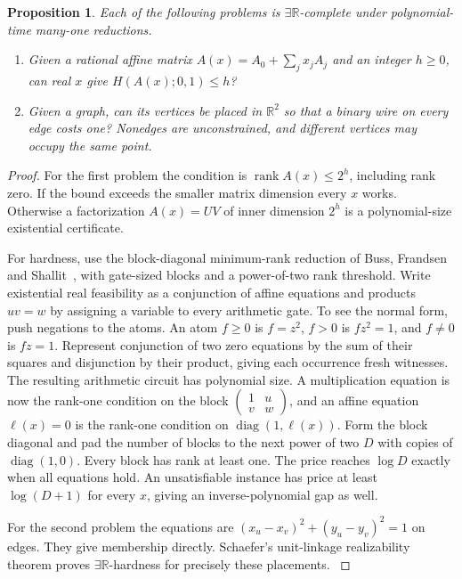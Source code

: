 \documentclass[11pt,letterpaper]{article}
\newtheorem{proposition}[theorem]{Proposition}
\theoremstyle{definition}
\newcommand{\R}{\mathbb R}
\newcommand{\etr}{\exists\R}
\DeclareMathOperator{\rank}{rank}
\begin{document}
\begin{proposition}\label{prop:inverse}
Each of the following problems is \(\etr\)-complete under polynomial-time
many-one reductions.
\begin{enumerate}
\item Given a rational affine matrix \(A(x)=A_0+\sum_j x_j A_j\) and
an integer \(h\ge0\), can real \(x\) give \(H(A(x);0,1)\le h\)?
\item Given a graph, can its vertices be placed in \(\R^2\) so that a
binary wire on every edge costs one? Nonedges are unconstrained, and
different vertices may occupy the same point.
\end{enumerate}
\end{proposition}
\begin{proof}
For the first problem the condition is \(\rank A(x)\le2^h\), including
rank zero. If the bound exceeds the smaller matrix dimension every \(x\)
works. Otherwise a factorization \(A(x)=UV\) of inner dimension \(2^h\)
is a polynomial-size existential certificate.

For hardness, use the block-diagonal minimum-rank reduction of Buss, Frandsen and Shallit~\cite[Sections~11--12]{bfs-minrank}, with gate-sized blocks and a power-of-two rank threshold. Write existential real feasibility as a conjunction of affine equations and products \(uv=w\) by assigning a variable to every arithmetic gate. To see the normal form, push negations to the atoms. An atom \(f\ge0\)
is \(f=z^2\), \(f>0\) is \(fz^2=1\), and \(f\ne0\) is \(fz=1\).
Represent conjunction of two zero equations by the sum of their squares
and disjunction by their product, giving each occurrence fresh witnesses.
The resulting arithmetic circuit has polynomial size. A multiplication
equation is now the rank-one condition on the block
\(\left(\begin{smallmatrix}1&u\\v&w\end{smallmatrix}\right)\), and an
affine equation \(\ell(x)=0\) is the rank-one condition on
\(\operatorname{diag}(1,\ell(x))\). Form the block diagonal and pad the
number of blocks to the next power of two \(D\) with copies of
\(\operatorname{diag}(1,0)\). Every block has rank at least one.
The price reaches \(\log D\) exactly when all equations hold. An
unsatisfiable instance has price at least \(\log(D+1)\) for every \(x\),
giving an inverse-polynomial gap as well.

For the second problem the equations are
\((x_u-x_v)^2+(y_u-y_v)^2=1\) on edges. They give membership directly.
Schaefer's unit-linkage realizability theorem proves \(\etr\)-hardness
for precisely these placements. \cite[Theorem~3.1]{schaefer-linkages}
\end{proof}
\end{document}
